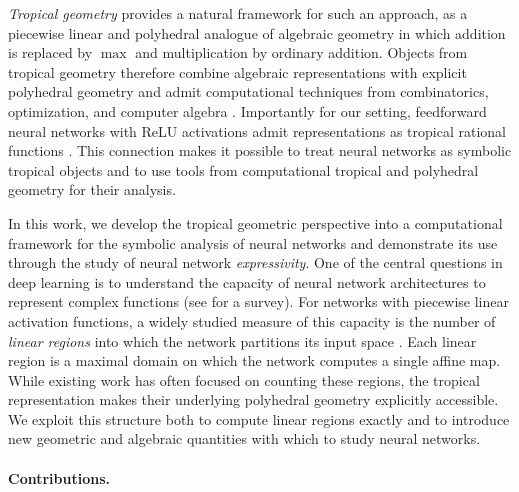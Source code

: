 \documentclass[10pt]{article}
\theoremstyle{definition}
\theoremstyle{remark}
\begin{document}
\emph{Tropical geometry} provides a natural framework for such an approach, as a piecewise linear and polyhedral analogue of algebraic geometry in which addition is replaced by $\max$ and multiplication by ordinary addition.  Objects from tropical geometry therefore combine algebraic representations with explicit polyhedral geometry and admit computational techniques from combinatorics, optimization, and computer algebra \citep[e.g.,][]{mikhalkin2009tropical, speyer2009tropical, maclagan2015introduction}.  Importantly for our setting, feedforward neural networks with ReLU activations admit representations as tropical rational functions \citep{zhang2018tropical}.  This connection makes it possible to treat neural networks as symbolic tropical objects and to use tools from computational tropical and polyhedral geometry for their analysis.

In this work, we develop the tropical geometric perspective into a computational framework for the symbolic analysis of neural networks and demonstrate its use through the study of neural network \emph{expressivity}.  One of the central questions in deep learning is to understand the capacity of neural network architectures to represent complex functions (see \cite{hu2021model} for a survey).  For networks with piecewise linear activation functions, a widely studied measure of this capacity is the number of \emph{linear regions} into which the network partitions its input space \citep[e.g.,][]{pascanu2013number, montufar2014number, arora2016understanding, raghu2017expressive, hanin2019deep, xiong2020number, goujon2024number, montufar2022sharp}.  Each linear region is a maximal domain on which the network computes a single affine map.  While existing work has often focused on counting these regions, the tropical representation makes their underlying polyhedral geometry explicitly accessible.  We exploit this structure both to compute linear regions exactly and to introduce new geometric and algebraic quantities with which to study neural networks.

\paragraph{Contributions.}
\end{document}
